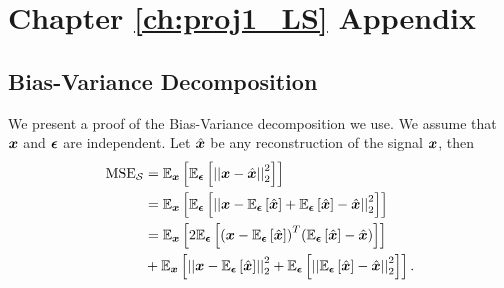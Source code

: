 \chapter{\label{app:1-proj1}Chapter \ref{ch:proj1_LS} Appendix}


\section{Bias-Variance Decomposition}
\label{app:bias-variance}
We present a proof of the Bias-Variance decomposition we use. We assume that $\bm{x}$ and $\bm{\epsilon}$ are independent. Let $\hat{\bm{x}}$ be any reconstruction of the signal $\bm{x}$, then
\begin{align}
    \textrm{MSE}_{\set{S}} &= \expect[\vect{x}]{\expect[\vect{\epsilon}]{\sqnormvec{\vect{x} - \hat{\vect{x}}}}}\\
    &= \expect[\vect{x}]{\expect[\vect{\epsilon}]{\sqnormvec{\vect{x} - \expect[\vect{\epsilon}]{\hat{\vect{x}}} + \expect[\vect{\epsilon}]{\hat{\vect{x}}} - \hat{\vect{x}}}}}\\
    &= \expect[\vect{x}]{2 {\expect[\vect{\epsilon}]{ {\left(\vect{x} - \expect[\vect{\epsilon}]{\hat{\vect{x}}} \right)^{T}} {\left(\expect[\vect{\epsilon}]{\hat{\vect{x}}} - \hat{\vect{x}}\right) }}} } \label{eq:bias_variance_decomp:cross_terms} \\
    &+ \expect[\vect{x}]{{\sqnormvec{\vect{x} - \expect[\vect{\epsilon}]{\hat{\vect{x}}}}} + {\expect[\vect{\epsilon}]{\sqnormvec{ \expect[\vect{\epsilon}]{\hat{\vect{x}}} - \hat{\vect{x}}}}}} \label{eq:bias_var_decomp1}.
\end{align}


